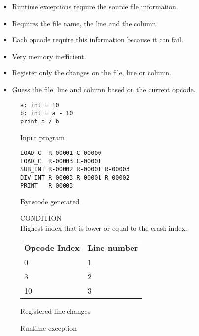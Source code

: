 \begin{slide}
    \begin{itemize}
        \item Runtime exceptions require the source file information.
        \item Requires the file name, the line and the column.
        \item Each opcode require this information because it can fail.
        \item Very memory inefficient.
    \end{itemize}
    \begin{itemize}
        \item Register only the changes on the file, line or column.
        \item Guess the file, line and column based on the current opcode.
    \end{itemize}
\end{slide}
\begin{slide}
    \begin{figure}[H]
        \centering
        \begin{subtable}{0.3\textwidth}
            \begin{verbatim}
a: int = 10
b: int = a - 10
print a / b
            \end{verbatim}
        \caption{Input program}
        \end{subtable}
        \begin{subtable}{0.6\textwidth}
            \begin{verbatim}
LOAD_C  R-00001 C-00000
LOAD_C  R-00003 C-00001
SUB_INT R-00002 R-00001 R-00003
DIV_INT R-00003 R-00001 R-00002
PRINT   R-00003
            \end{verbatim}
        \caption{Bytecode generated}
        \end{subtable}
        \begin{subtable}{0.3\textwidth}
            {\footnotesize \textsc{CONDITION}}\\
            Highest index that is lower or equal to the crash index.
        \end{subtable}
        \begin{subtable}{0.6\textwidth}
            \centering
            \begin{tabular}{ l l }
                \textbf{Opcode Index} & \textbf{Line number} \\
                0 & 1 \\
                3 & 2 \\
                10 & 3 \\
            \end{tabular}
        \caption{Registered line changes}
        \end{subtable}
    \caption{Runtime exception}
    \end{figure}
\end{slide}
